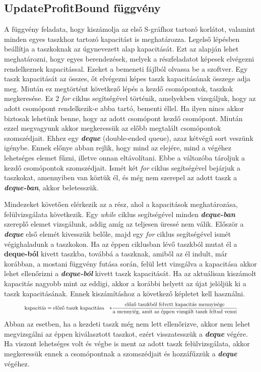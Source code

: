 \subsection{UpdateProfitBound függvény}
A függvény feladata, hogy kiszámolja az első S-gráfhoz tartozó korlátot, valamint minden egyes taszkhoz tartozó kapacitást is meghatározza. Legelső lépésben beállítja a taszkoknak az úgynevezett alap kapacitását. Ezt az alapján lehet meghatározni, hogy egyes berendezések, melyek a részfeladatot képesek elvégezni rendelkeznek kapacitással. Ezeket a bemeneti fájlból olvassa be a szoftver. Egy taszk kapacitását az összes, őt elvégezni képes taszk kapacitásának összege adja meg. Miután ez megtörtént következő lépés a kezdő csomópontok, taszkok megkeresése. Ez 2 \textit{for} ciklus segítségével történik, amelyekben vizsgáljuk, hogy az adott csomópont rendelkezik-e abba tartó, bementi éllel. Ha ilyen nincs akkor biztosak lehetünk benne, hogy az adott csomópont kezdő csomópont. Miután ezzel megvagyunk akkor megkeressük az előbb megtalált csomópontok szomszédjait. Ehhez egy \textbf{\textit{deque}} (double-ended queue), azaz kétvégű sort veszünk igénybe. Ennek előnye abban rejlik, hogy mind az elejére, mind a végéhez lehetséges elemet fűzni, illetve onnan eltávolítani. Ebbe a változóba tároljuk a kezdő csomópontok szomszédjait. Ismét két \textit{for} ciklus segítségével bejárjuk a taszkokat, amennyiben van köztük él, és még nem szerepel az adott taszk a \textbf{\textit{deque-ban}}, akkor beletesszük.

Mindezeket követően elérkezik az a rész, ahol a kapacitások meghatározása, felülvizsgálata következik. Egy \textit{while} ciklus segítségével minden \textbf{\textit{deque-ban}} szereplő elemet vizsgálunk, addig amíg az teljesen üressé nem válik. Először a \textbf{\textit{deque}} első elemét kivesszük belőle, majd egy \textit{for} ciklus segítségével ismét végighaladunk a taszkokon. Ha az éppen ciklusban lévő taszkból mutat él a \textbf{deque-ból} kivett taszkba, továbbá a taszknak, amiből az él indult, már korábban, a mostani függvény futása során, felül lett vizsgálva a kapacitása akkor lehet ellenőrizni a \textbf{\textit{deque-ból}} kivett taszk kapacitását. Ha az aktuálisan kiszámolt kapacitás nagyobb mint az eddigi, akkor a korábbi helyett az újat jelöljük ki a taszk kapacitásának. Ennek kiszámításhoz a következő képletet kell használni.
\begin{gather}
\scalebox{0.75}{$
\begin{align*}
\text{kapacitás}&= \text{előző taszk kapacitása}&*\frac{\text{előző taszkból felvett kapacitás mennyisége}}{\text{a mennyiég, amit az éppen vizsgált taszk feltud venni}}
\end{align*}$}	
\end{gather}
Abban az esetben, ha a kezdeti taszk még nem lett ellenőrizve, akkor nem lehet megvizsgálni az éppen kiválasztott taszkot, ezért visszatesszük a \textbf{\textit{deque}} végére. Ha viszont lehetséges volt és végbe is ment az adott taszk felülvizsgálata, akkor megkeressük ennek a csomópontnak a szomszédjait és hozzáfűzzük a \textbf{\textit{deque}} végéhez.

